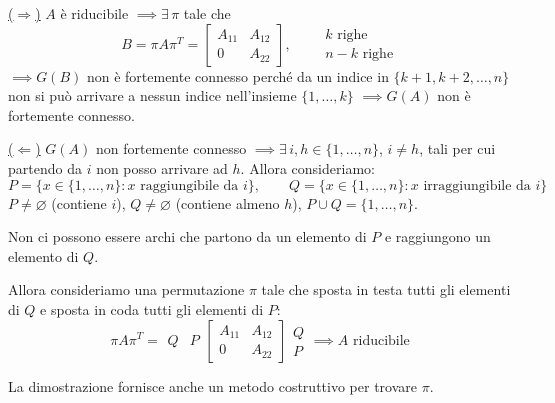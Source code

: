 \documentclass[12pt,a4paper,]{report}
\begin{document}
\begin{dimostrazione}
    \underline{($\Rightarrow$)} $A$ è riducibile $\implies \exists\,\pi$ tale che
    \[
    B = \pi A \pi^T = \begin{bmatrix} A_{11} & A_{12} \\ 0 & A_{22}\end{bmatrix}, \qquad
    \begin{array}{l} k \text{ righe} \\ n-k \text{ righe}\end{array}
    \]
    $\implies G(B)$ non è fortemente connesso perché da un indice in $\{k+1,k+2,\dots,n\}$ non si può arrivare a nessun indice nell'insieme $\{1,\dots,k\}$ $\implies G(A)$ non è fortemente connesso.

    \bigskip
    \noindent
    \underline{($\Leftarrow$)} $G(A)$ non fortemente connesso $\implies \exists\, i,h\in\{1,\dots,n\}$, $i\neq h$, tali per cui partendo da $i$ non posso arrivare ad $h$.
    Allora consideriamo:
    \[
    P = \{x\in\{1,\dots,n\} : x \text{ raggiungibile da } i\}, \qquad
    Q = \{x\in\{1,\dots,n\} : x \text{ irraggiungibile da } i\}
    \]
    $P\neq\varnothing$ (contiene $i$), $Q\neq\varnothing$ (contiene almeno $h$), $P\cup Q = \{1,\dots,n\}$.

    \begin{nota}
        Non ci possono essere archi che partono da un elemento di $P$ e raggiungono un elemento di $Q$.
    \end{nota}

    Allora consideriamo una permutazione $\pi$ tale che sposta in testa tutti gli elementi di $Q$ e sposta in coda tutti gli elementi di $P$:
    \[
    \pi A \pi^T =
    \begin{array}{cc} \scriptstyle Q & \scriptstyle P \end{array}
    \begin{bmatrix} A_{11} & A_{12} \\ 0 & A_{22} \end{bmatrix}
    \begin{array}{l} \scriptstyle Q \\ \scriptstyle P \end{array}
    \implies A \text{ riducibile}
    \]
    \begin{nota}
        La dimostrazione fornisce anche un metodo costruttivo per trovare $\pi$.
    \end{nota}
\end{dimostrazione}
\end{document}

